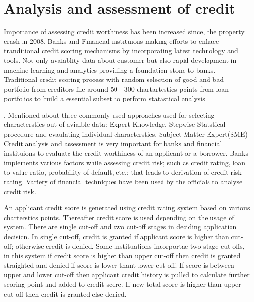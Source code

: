 {\section{Analysis and assessment of credit}\label{tech.crisk}

Importance of assessing credit worthiness has been increased since, the property crash in 2008. Banks and Financial instituions making efforts to enhace tranditional credit scoring mechanisms by incorporating latest technology and tools. Not only avaiablity data about customer but also rapid development in machine learning and analytics providing a foundation stone to banks. \\

Traditional credit scoring process with random selection of good and bad portfolio from creditors file around 50 - 300 \citet{capon1982credit} chartartestics points from loan portfolios to build a essential subset to perform statastical analysis .

\citep{10.2307/2983268}, Mentioned about three commonly used approaches used for selecting characterstics out of avialble data: Expert Knowledge, Stepwise Statstical procedure and evaulating individual characterstics. Subject Matter Expert(SME) \\

Credit analysis and assessment is very important for banks and financial instituions to evaluate the credit worthiness of an applicant or a borrower. Banks implements various factors while assessing credit risk; such as credit rating, loan to value ratio, probability of default, etc.; that leads to derivation of credit risk rating. Variety of financial techniques have been used by the officials to analyse credit risk. 


An applicant credit score is generated using credit rating system based on various charterstics points. Thereafter credit score is used depending on the usage of system. There are single cut-off and two cut-off stages in deciding application decision. In single cut-off, credit is granted if applicant score is higher than cut-off; otherwise credit is denied. Some instituations incorportae two stage cut-offs, in this system if credit score is higher than upper cut-off then credit is granted straighted and denied if score is lower thant lower cut-off. If score is between upper and lower cut-off then applicant credit history is pulled to calculate further scoring point and added to credit score. If new total score is higher than upper cut-off then credit is granted else denied.\\

}

